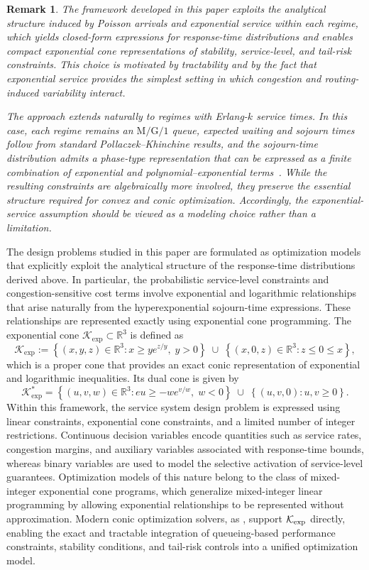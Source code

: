 \documentclass[letter,11pt, reqno]{amsart}
\newtheorem{rem}{Remark}
\begin{document}
\begin{rem}
The framework developed in this paper exploits the analytical structure induced by
Poisson arrivals and exponential service within each regime, which yields closed-form
expressions for response-time distributions and enables compact exponential cone
representations of stability, service-level, and tail-risk constraints. This choice
is motivated by tractability and by the fact that exponential service provides the
simplest setting in which congestion and routing-induced variability interact.

The approach extends naturally to regimes with Erlang-$k$ service times. In this
case, each regime remains an $\mathrm{M}/\mathrm{G}/1$ queue, expected waiting and
sojourn times follow from standard Pollaczek--Khinchine results, and the
sojourn-time distribution admits a phase-type representation that can be expressed
as a finite combination of exponential and polynomial--exponential terms~\citep[see, e.g.,][]{Asmussen2003,Gross2008}. While the
resulting constraints are algebraically more involved, they preserve the essential
structure required for convex and conic optimization. Accordingly, the
exponential-service assumption should be viewed as a modeling choice rather than a
limitation.
\end{rem}

The design problems studied in this paper are formulated as optimization models
that explicitly exploit the analytical structure of the response-time
distributions derived above. In particular, the probabilistic service-level
constraints and congestion-sensitive cost terms involve exponential and
logarithmic relationships that arise naturally from the hyperexponential
sojourn-time expressions. These relationships are represented exactly using
exponential cone programming. The exponential cone
$\mathcal{K}_{\exp}\subset\mathbb{R}^3$ is defined as
$$
\mathcal{K}_{\exp}
:=
\left\{
(x,y,z)\in\mathbb{R}^3 :
x \ge y e^{z/y},\; y>0
\right\}
\;\cup\;
\left\{
(x,0,z)\in\mathbb{R}^3 :
z\leq 0\leq x
\right\},
$$
which is a proper cone that provides an exact conic representation of exponential and logarithmic inequalities. Its dual cone is given by
$$
\mathcal{K}_{\exp}^\ast
=
\left\{
(u,v,w)\in\mathbb{R}^3 :
eu \geq - w e^{v/w},\; w < 0\right\}
\;\cup\;
\left\{
(u,v,0): u,v\ge 0
\right\}.
$$
Within this framework, the service system design problem is expressed using
linear constraints, exponential cone constraints, and a limited number of
integer restrictions. Continuous decision variables encode quantities such as
service rates, congestion margins, and auxiliary variables associated with
response-time bounds, whereas binary variables are used to model the selective
activation of service-level guarantees. Optimization models of this nature belong
to the class of mixed-integer exponential cone programs, which generalize mixed-integer linear programming by allowing exponential
relationships to be represented without approximation. Modern conic optimization solvers, as \cite{mosek},
support $\mathcal{K}_{\rm exp}$ directly, enabling the exact and tractable
integration of queueing-based performance constraints, stability conditions, and
tail-risk controls into a unified optimization model.
\end{document}
